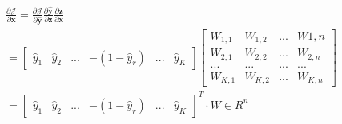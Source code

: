 \documentclass[UTF8]{article}
\begin{document}
\begin{equation}
\begin{aligned}
\frac{\partial{\mathcal{J}}}{\partial{\boldsymbol{x}}}=\frac{\partial{\mathcal{J}}}{\partial{\hat{\boldsymbol{y}}}} \frac{\partial{\hat{\boldsymbol{y}}}}{\partial{\boldsymbol{z}}} \frac{\partial{\boldsymbol{z}}}{\partial{\boldsymbol{x}}} \\
=\begin{bmatrix}
\hat{y}_{1} & \hat{y}_{2} & ... & -(1-\hat{y}_{r}) & ... & \hat{y}_{K}
\end{bmatrix} \begin{bmatrix}
W_{1,1} & W_{1,2} & ... & W{1,n} \\
W_{2,1} & W_{2,2} & ... & W_{2,n} \\
... & ... & ... & ... \\
W_{K,1} & W_{K,2} & ... & W_{K,n}
\end{bmatrix} \\
=\begin{bmatrix}
\hat{y}_{1} & \hat{y}_{2} & ... & -(1-\hat{y}_{r}) & ... & \hat{y}_{K}
\end{bmatrix}^{T} \cdot W \in R^{n}
\end{aligned}
\label{mlp-pj-px-def}
\end{equation}
\end{document}
